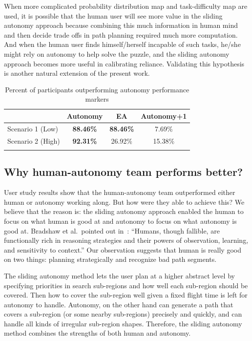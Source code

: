 \documentclass[lettersize, apacite, twoside, HRI]{apa_HRI}
\begin{document}
When more complicated probability distribution map and task-difficulty map are used, it is possible that the human user will see more value in the sliding autonomy approach because combining this much information in human mind and then decide trade offs in path planning required much more computation. And when the human user finds himself/herself incapable of such tasks, he/she might rely on autonomy to help solve the puzzle, and the sliding autonomy approach becomes more useful in calibrating reliance. Validating this hypothesis is another natural extension of the present work.

\begin{table}
\caption{Percent of participants outperforming autonomy performance markers}
	\centering
		\begin{tabular}
			{|l|c|c|c|}
			\hline
			 & Autonomy & EA & Autonomy+1 \\
			\hline
			Scenario 1 (Low) & \textbf{88.46\%} & \textbf{88.46\%} & 7.69\% \\
			\hline
			Scenario 2 (High) & \textbf{92.31\%} & 26.92\% & 15.38\% \\
			\hline
			\multicolumn{4}{c}{}  %
		\end{tabular}
\label{CompareToMarkers}
\end{table}

\subsection{Why human-autonomy team performs better?}

User study results show that the human-autonomy team outperformed either human or autonomy working along. But how were they able to achieve this? We believe that the reason is: the sliding autonomy approach enabled the human to focus on what human is good at and autonomy to focus on what autonomy is good at. Bradshaw et al.\ pointed out in~\cite{Bradshaw2013Seven}: ``Humans, though fallible, are functionally rich in reasoning strategies and their powers of observation, learning, and sensitivity to context.'' Our observation suggests that human is really good on two things: planning strategically and recognize bad path segments.

The sliding autonomy method lets the user plan at a higher abstract level by specifying priorities in search sub-regions and how well each sub-region should be covered. Then how to cover the sub-region well given a fixed flight time is left for autonomy to handle. Autonomy, on the other hand can generate a path that covers a sub-region (or some nearby sub-regions) precisely and quickly, and can handle all kinds of irregular sub-region shapes. Therefore, the sliding autonomy method combines the strengths of both human and autonomy.
\end{document}
